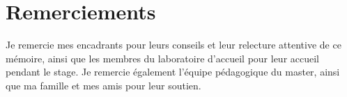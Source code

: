 \chapter*{Remerciements}


Je remercie mes encadrants pour leurs conseils et leur relecture attentive de ce
mémoire, ainsi que les membres du laboratoire d'accueil pour leur accueil
pendant le stage. Je remercie également l'équipe pédagogique du master, ainsi
que ma famille et mes amis pour leur soutien.
